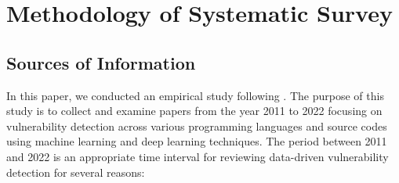 
\section{Methodology of Systematic Survey}
\subsection{Sources of Information}
In this paper, we conducted an empirical study following \cite{keele2007guidelines,petersen2015guidelines}. The purpose of this study is to collect and examine papers from the year 2011 to 2022 focusing on vulnerability detection across various programming languages and source codes using machine learning and deep learning techniques. The period between 2011 and 2022 is an appropriate time interval for reviewing data-driven vulnerability detection for several reasons: 
